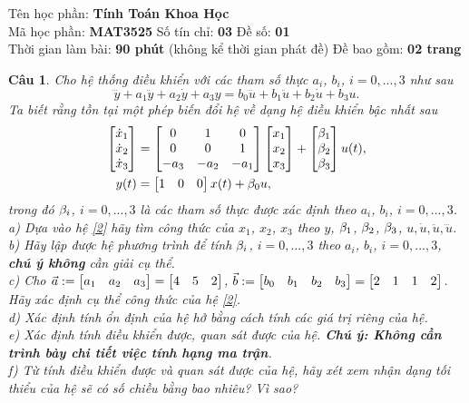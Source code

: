 \documentclass[11pt]{article}
\newtheorem{bt}{Câu}
\begin{document}



\begin{center}
Tên học phần: {\bf Tính Toán Khoa Học} \\ 
Mã học phần: \textbf{MAT3525}	\quad Số tín chỉ: \textbf{03} \quad	Đề số: \textbf{01} \\ 
Thời gian làm bài: \textbf{90 phút} (không kể thời gian phát đề) \quad Đề bao gồm: \textbf{02 trang}
\end{center}

\begin{bt}
Cho hệ thống điều khiển với các tham số thực $a_i$, $b_i$, $i=0,...,3$ như sau
%
\begin{equation}\label{1}
	\dddot{y} + a_1 \ddot{y} + a_2 \dot{y} + a_3 y = b_0 \dddot{u} + b_1 \ddot{u} + b_2 \dot{u} + b_3 u.
\end{equation}
%
Ta biết rằng tồn tại một phép biến đổi hệ về dạng hệ điều khiển bậc nhất sau
%
\begin{align}\label{2}
	\begin{bmatrix} \dot{x}_1 \\ \dot{x}_2 \\ \dot{x}_3 \end{bmatrix} &= \begin{bmatrix} 0 & 1 & 0 \\ 0 & 0 & 1 \\ -a_3 & -a_2 & -a_1 \end{bmatrix} \begin{bmatrix} x_1 \\ x_2 \\ x_3 \end{bmatrix} + \begin{bmatrix} \beta_1 \\ \beta_2 \\ \beta_3  \end{bmatrix} u(t), \\
	y(t) &= \begin{bmatrix} 1 & 0 & 0 \end{bmatrix} x(t) + \beta_0 u, \notag
\end{align}
%
trong đó $\beta_i$, $i=0,...,3$ là các tham số thực được xác định theo $a_i$, $b_i$, $i=0,...,3$. \\
%
a) Dựa vào hệ \eqref{2} hãy tìm công thức của $x_1$, $x_2$, $x_3$ theo $y$, $\beta_1$, $\beta_2$, $\beta_3$, $u,\dot{u},\ddot{u},\dddot{u}$. \\ 
b) Hãy lập được hệ phương trình để tính $\beta_i$, $i=0,...,3$  theo $a_i$, $b_i$, $i=0,...,3$, \textbf{chú ý không} cần giải cụ thể. \\
c) Cho $\vec{a} := \begin{bmatrix} a_1 & a_2 & a_3 \end{bmatrix} = \begin{bmatrix} 4 & 5 & 2 \end{bmatrix}$, $\vec{b} := \begin{bmatrix} b_0 & b_1 & b_2 & b_3 \end{bmatrix} = \begin{bmatrix} 2 & 1 & 1 & 2 \end{bmatrix}$. Hãy xác định cụ thể công thức của hệ \eqref{2}. \\
d) Xác định tính ổn định của hệ hở bằng cách tính các giá trị riêng của hệ. \\
e) Xác định tính điều khiển được, quan sát được của hệ. \textbf{Chú ý: Không cần trình bày chi tiết việc tính hạng ma trận}. \\
f) Từ tính điều khiển được và quan sát được của hệ, hãy xét xem nhận dạng tối thiểu của hệ sẽ có số chiều bằng bao nhiêu? Vì sao?
\end{bt}
\end{document}
